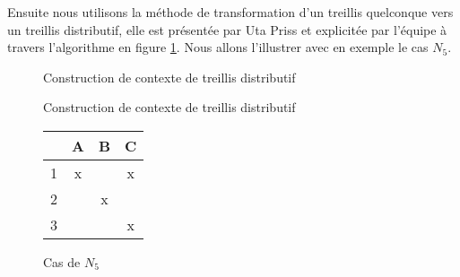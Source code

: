 Ensuite nous utilisons la méthode de transformation d'un treillis quelconque vers un treillis distributif, elle est présentée par Uta Priss et explicitée par l'équipe à travers l'algorithme en figure \ref{algo_cla}. Nous allons l'illustrer avec en exemple le cas $N_5$.

\begin{figure}[H]
\begin{algorithm}[H]
	\DontPrintSemicolon
	\caption{Construction de contexte de treillis distributif}


\end{algorithm}
\caption{Construction de contexte de treillis distributif}
\label{algo_cla}
\end{figure}

\begin{figure}[H]
	\begin{minipage}[c]{0.5\textwidth}
	\begin{center}
		\begin{tabular}{ l | c c c }
			 & A & B & C \\
			\hline
			1 & x & & x \\
			2 & & x & \\
			3 & & & x \\
		\end{tabular}
	\end{center}
	\end{minipage}
	\begin{minipage}[c]{0.5\textwidth}
	\begin{center}
	\end{center}
	\end{minipage}
	\caption{Cas de $N_5$}
\end{figure}

